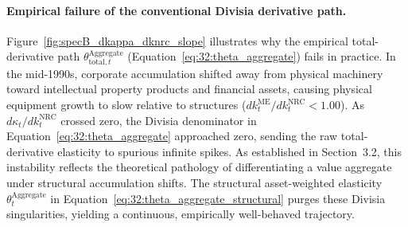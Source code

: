 \paragraph{Empirical failure of the conventional Divisia derivative path.}
Figure~\ref{fig:specB_dkappa_dknrc_slope} illustrates why the empirical total-derivative path $\theta^{\text{Aggregate}}_{\text{total},t}$ (Equation~\eqref{eq:32:theta_aggregate}) fails in practice. In the mid-1990s, corporate accumulation shifted away from physical machinery toward intellectual property products and financial assets, causing physical equipment growth to slow relative to structures ($dk^{\text{ME}}_t / dk^{\text{NRC}}_t < 1.00$). As $d\kappa_t / dk^{\text{NRC}}_t$ crossed zero, the Divisia denominator in Equation~\eqref{eq:32:theta_aggregate} approached zero, sending the raw total-derivative elasticity to spurious infinite spikes. As established in Section~3.2, this instability reflects the theoretical pathology of differentiating a value aggregate under structural accumulation shifts. The structural asset-weighted elasticity $\theta^{\text{Aggregate}}_t$ in Equation~\eqref{eq:32:theta_aggregate_structural} purges these Divisia singularities, yielding a continuous, empirically well-behaved trajectory.
